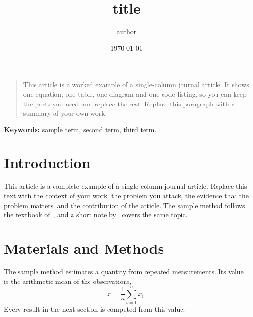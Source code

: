 \documentclass[a4paper,11pt,twoside]{article}
\title{{{title}}}
\author[1]{{{author}}}
\affil[1]{{{affiliation}}\\ \texttt{{{email}}}}
\date{\today}
\newcommand{\lblKeywords}{Keywords}
\renewenvironment{abstract}
{\begin{quote}\small{\scshape\bfseries\color{articlelink}\abstractname}\quad\ignorespaces}
  {\end{quote}}
\begin{document}
  \maketitle

  \begin{abstract}
    This article is a worked example of a single-column journal article. It
    shows one equation, one table, one diagram and one code listing, so you can
    keep the parts you need and replace the rest. Replace this paragraph with a
    summary of your own work.
  \end{abstract}

  \noindent\textbf{\lblKeywords:} sample term, second term, third term.

  \section{Introduction}
  This article is a complete example of a single-column journal article.
  Replace this text with the context of your work: the problem you attack,
  the evidence that the problem matters, and the contribution of the article.
  The sample method follows the textbook of~\cite{smith2022}, and a short note
  by~\cite{lee2024} covers the same topic.

  \section{Materials and Methods}
  The sample method estimates a quantity from repeated measurements. Its value
  is the arithmetic mean of the observations,
  \begin{equation}
    \bar{x} = \frac{1}{n} \sum_{i=1}^{n} x_i .
    \label{eq:mean}
  \end{equation}
  Every result in the next section is computed from this value.
\end{document}
